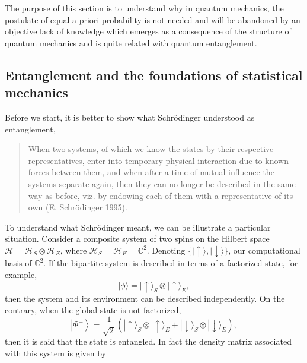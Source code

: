 The purpose of this section is to understand why in quantum mechanics, the postulate of equal a priori probability is not needed and will be abandoned by an objective lack of knowledge which emerges as a consequence of the structure of quantum mechanics and is quite related with quantum entanglement. 
\subsection{Entanglement and the foundations of statistical mechanics}
Before we start, it is better to show what Schr\"odinger understood as entanglement, 
\begin{quote}
When two systems, of which we know the states by their respective representatives, enter into temporary physical interaction due to known forces between them, and when after a time of mutual influence the systems separate again, then they can no longer be described in the same way as before, viz. by endowing each of them with a representative of its own (E. Schr\"odinger 1995\cite{schrodinger_discussion_1935}).
\end{quote}
To understand what Schr\"odinger meant, we can be illustrate a particular situation. Consider a composite system of two spins on the Hilbert space $\mathcal{H}=\mathcal{H}_S\otimes \mathcal{H}_{E}$, where $\mathcal{H}_{S}=\mathcal{H}_{E} = \mathbb{C}^{2}$. Denoting $\{|\uparrow\rangle,|\downarrow\rangle\}$, our computational basis of $\mathbb{C}^{2}$\cite{ekert_basic_2000, nielsen_quantum_2000, edwin_optimal_1979}.
If the bipartite system is described in terms of a factorized state, for example,
\begin{equation}
|\phi\rangle=|\uparrow\rangle_{S} \otimes|\uparrow\rangle_{E},
\label{CH1:Entanglement_example_1}
\end{equation}
then the system and its environment can be described independently. On the contrary, when the global state is not factorized,
\begin{equation}
\left|\Phi^{+}\right\rangle=\frac{1}{\sqrt{2}}\left(|\uparrow\rangle_{S} \otimes|\uparrow\rangle_{E}+|\downarrow\rangle_{S} \otimes|\downarrow\rangle_{E}\right),
\label{CH1:Entanglement_example_2}
\end{equation}
then it is said that the state is entangled. In fact the density matrix associated with this system is given by

